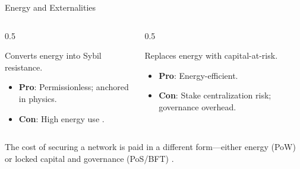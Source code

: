 \documentclass[aspectratio=169]{beamer}
\begin{document}
\begin{frame}{Energy and Externalities}
    \begin{columns}[T]
        \begin{column}{0.5\linewidth}
            \begin{tcolorbox}[enhanced, colback=d2s.fg!30, colframe=black, fonttitle=\bfseries, title={Proof-of-Work}, rounded corners, drop shadow]
            Converts energy into Sybil resistance.
            \begin{itemize}
                \item \textbf{Pro}: Permissionless; anchored in physics.
                \item \textbf{Con}: High energy use \cite{mahajan_ais_2025}.
            \end{itemize}
            \end{tcolorbox}
        \end{column}
        \begin{column}{0.5\linewidth}
            \begin{tcolorbox}[enhanced, colback=d2s.fg!30, colframe=black, fonttitle=\bfseries, title={BFT / Proof-of-Stake}, rounded corners, drop shadow]
            Replaces energy with capital-at-risk.
            \begin{itemize}
                \item \textbf{Pro}: Energy-efficient.
                \item \textbf{Con}: Stake centralization risk; governance overhead.
            \end{itemize}
            \end{tcolorbox}
        \end{column}
    \end{columns}
    \vfill
    \begin{tcolorbox}[enhanced, colback=red!20, colframe=red!75!black, fonttitle=\bfseries, title={There Is No "Free" Security}, rounded corners, drop shadow]
    The cost of securing a network is paid in a different form—either energy (PoW) or locked capital and governance (PoS/BFT) \cite{bano_blockchain_2017}.
    \end{tcolorbox}
\end{frame}
\end{document}
